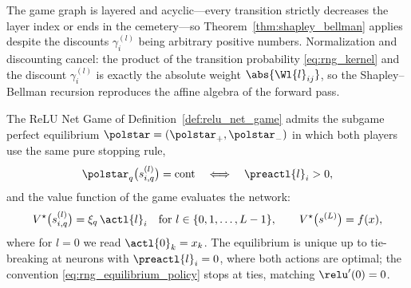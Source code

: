 The game graph is layered and acyclic---every transition strictly decreases the layer index or ends in the cemetery---so Theorem~\ref{thm:shapley_bellman} applies despite the discounts $\gamma^{(l)}_i$ being arbitrary positive numbers. Normalization and discounting cancel: the product of the transition probability \eqref{eq:rng_kernel} and the discount $\gamma^{(l)}_i$ is exactly the absolute weight $\abs{\Wl{l}_{ij}}$, so the Shapley--Bellman recursion reproduces the affine algebra of the forward pass.

\begin{theoremenv}\label{thm:relu_net_game_value}
The ReLU Net Game of Definition~\ref{def:relu_net_game} admits the subgame perfect equilibrium $\polstar = (\polstar_{+}, \polstar_{-})$ in which both players use the same pure stopping rule,
\begin{equation}
	\polstar_{q}\bigl( s^{(l)}_{i,q} \bigr) = \mathrm{cont}
	\quad \Longleftrightarrow \quad
	\preactl{l}_i > 0,
	\label{eq:rng_equilibrium_policy}
\end{equation}
and the value function of the game evaluates the network:
\begin{equation}
	V^{\star}\bigl(s^{(l)}_{i,q}\bigr) = \xi_{q}\, \actl{l}_i
	\quad \text{for } l \in \{0, 1, \ldots, L-1\},
	\qquad
	V^{\star}\bigl(s^{(L)}\bigr) = f(x),
	\label{eq:rng_value_identity}
\end{equation}
where for $l = 0$ we read $\actl{0}_k = x_k$. The equilibrium is unique up to tie-breaking at neurons with $\preactl{l}_i = 0$, where both actions are optimal; the convention \eqref{eq:rng_equilibrium_policy} stops at ties, matching $\relu'(0) = 0$.
\hfill{}
\end{theoremenv}

